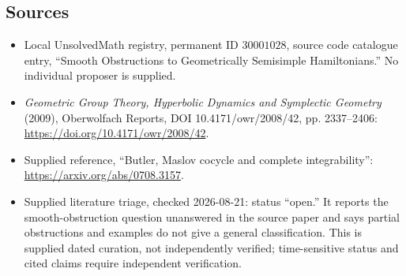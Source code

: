 \documentclass[11pt]{article}
\begin{document}
\subsection{Sources}
\begin{itemize}
\item Local UnsolvedMath registry, permanent ID \(30001028\), source code catalogue entry, ``Smooth Obstructions to Geometrically Semisimple Hamiltonians.'' No individual proposer is supplied.
\item \emph{Geometric Group Theory, Hyperbolic Dynamics and Symplectic Geometry} (2009), Oberwolfach Reports, DOI 10.4171/owr/2008/42, pp. 2337--2406: \url{https://doi.org/10.4171/owr/2008/42}.
\item Supplied reference, ``Butler, Maslov cocycle and complete integrability'': \url{https://arxiv.org/abs/0708.3157}.
\item Supplied literature triage, checked 2026-08-21: status ``open.'' It reports the smooth-obstruction question unanswered in the source paper and says partial obstructions and examples do not give a general classification. This is supplied dated curation, not independently verified; time-sensitive status and cited claims require independent verification.
\end{itemize}
\end{document}
